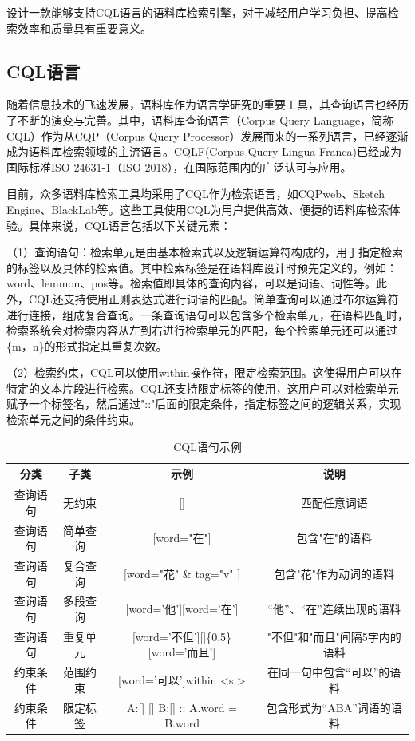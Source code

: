 \documentclass[11pt]{article}
\begin{document}
\begin{CJK*}{UTF8}{gbsn}

设计一款能够支持CQL语言的语料库检索引擎，对于减轻用户学习负担、提高检索效率和质量具有重要意义。

\subsection{CQL语言}

随着信息技术的飞速发展，语料库作为语言学研究的重要工具，其查询语言也经历了不断的演变与完善。其中，语料库查询语言（Corpus Query Language，简称CQL）作为从CQP（Corpus Query Processor）发展而来的一系列语言，已经逐渐成为语料库检索领域的主流语言。CQLF(Corpus Query Lingua Franca)已经成为国际标准ISO 24631-1（ISO 2018），在国际范围内的广泛认可与应用。

目前，众多语料库检索工具均采用了CQL作为检索语言，如CQPweb、Sketch Engine、BlackLab等。这些工具使用CQL为用户提供高效、便捷的语料库检索体验。具体来说，CQL语言包括以下关键元素：

（1）查询语句：检索单元是由基本检索式以及逻辑运算符构成的，用于指定检索的标签以及具体的检索值。其中检索标签是在语料库设计时预先定义的，例如：word、lemmon、pos等。检索值即具体的查询内容，可以是词语、词性等。此外，CQL还支持使用正则表达式进行词语的匹配。简单查询可以通过布尔运算符进行连接，组成复合查询。一条查询语句可以包含多个检索单元，在语料匹配时，检索系统会对检索内容从左到右进行检索单元的匹配，每个检索单元还可以通过\{m，n\}的形式指定其重复次数。

（2）检索约束，CQL可以使用within操作符，限定检索范围。这使得用户可以在特定的文本片段进行检索。CQL还支持限定标签的使用，这用户可以对检索单元赋予一个标签名，然后通过"::"后面的限定条件，指定标签之间的逻辑关系，实现检索单元之间的条件约束。

\begin{table}[h]
	\begin{center}
		\begin{tabular}{|c|c|c|c|}
			\hline \bf 分类 & \bf 子类 & \bf 示例 & \bf 说明 \\ \hline
			查询语句 & 无约束 & [] & 匹配任意词语 \\
			查询语句 & 简单查询 & [word="在"] & 包含"在"的语料 \\
			查询语句 & 复合查询 & [word="花" \& tag="v" ] & 包含"花"作为动词的语料 \\
			查询语句 & 多段查询 & [word='他'][word='在'] & “他”、“在”连续出现的语料 \\
			查询语句 & 重复单元 & [word='不但'][]\{0,5\}[word='而且'] & "不但"和"而且"间隔5字内的语料 \\
			约束条件 & 范围约束 & [word='可以']within \textless s \textgreater & 在同一句中包含“可以”的语料 \\
			约束条件 & 限定标签 & A:[] [] B:[]  :: A.word = B.word	 & 包含形式为“ABA”词语的语料 \\
			\hline
		\end{tabular}
	\end{center}
	\caption{\label{font-table} CQL语句示例}
\end{table}


\end{CJK*}
\end{document}
